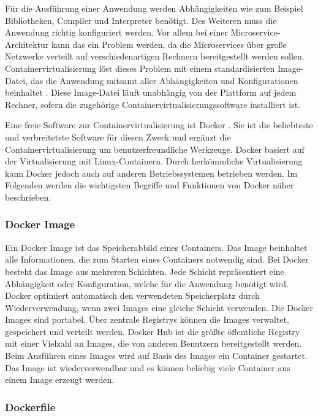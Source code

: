 Für die Ausführung einer Anwendung werden Abhängigkeiten wie zum Beispiel Bibliotheken, Compiler und Interpreter benötigt. Des Weiteren muss die Anwendung richtig konfiguriert werden. Vor allem bei einer Microservice-Architektur kann das ein Problem werden, da die Microservices über große Netzwerke verteilt auf verschiedenartigen Rechnern bereitgestellt werden sollen. Containervirtualisierung löst dieses Problem mit einem standardisierten Image-Datei, das die Anwendung mitsamt aller Abhängigkeiten und Konfigurationen beinhaltet \parencite[vgl.][S. 9]{arundelCloud2019}. Diese Image-Datei läuft unabhängig von der Plattform auf jedem Rechner, sofern die zugehörige Containervirtualisierungssoftware installiert ist.

Eine freie Software zur Containervirtualisierung ist Docker \parencite[vgl.][]{dockerinc.Docker2022}. Sie ist die beliebteste und verbreitetste Software für diesen Zweck \parencite[vgl.][S. 20]{hightowerKubernetes2018} und ergänzt die Containervirtualisierung um benutzerfreundliche Werkzeuge. Docker basiert auf der Virtualisierung mit Linux-Containern. Durch herkömmliche Virtualisierung kann Docker jedoch auch auf anderen Betriebssystemen betrieben werden. Im Folgenden werden die wichtigsten Begriffe und Funktionen von Docker näher beschrieben.

\subsubsection{Docker Image}

Ein Docker Image ist das Speicherabbild eines Containers. Das Image beinhaltet alle Informationen, die zum Starten eines Containers notwendig sind.  Bei Docker besteht das Image aus mehreren Schichten. Jede Schicht repräsentiert eine Abhängigkeit oder Konfiguration, welche für die Anwendung benötigt wird. Docker optimiert automatisch den verwendeten Speicherplatz durch Wiederverwendung, wenn zwei Images eine gleiche Schicht verwenden. Die Docker Images sind portabel. Über zentrale Registrys können die Images verwaltet, gespeichert und verteilt werden. Docker Hub ist die größte öffentliche Registry mit einer Vielzahl an Images, die von anderen Benutzern bereitgestellt werden. Beim Ausführen eines Images wird auf Basis des Images ein Container gestartet. Das Image ist wiederverwendbar und es können beliebig viele Container aus einem Image erzeugt werden. 

\subsubsection{Dockerfile}

